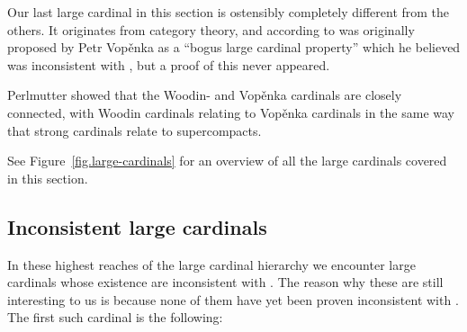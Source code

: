 \documentclass[../../main]{subfiles}
\begin{document}
Our last large cardinal in this section is ostensibly completely different from the others. It originates from category theory, and according to \cite{pudlak} was originally proposed by Petr Vop\v enka as a ``bogus large cardinal property'' which he believed was inconsistent with \zfc, but a proof of this never appeared.



Perlmutter showed that the Woodin- and Vop\v enka cardinals are closely connected, with Woodin cardinals relating to Vop\v enka cardinals in the same way that strong cardinals relate to supercompacts.


See Figure~\ref{fig.large-cardinals} for an overview of all the large cardinals covered in this section.

\subsection{Inconsistent large cardinals}

In these highest reaches of the large cardinal hierarchy we encounter large cardinals whose existence are inconsistent with \zfc. The reason why these are still interesting to us is because none of them have yet been proven inconsistent with \zf. The first such cardinal is the following:

\end{document}
